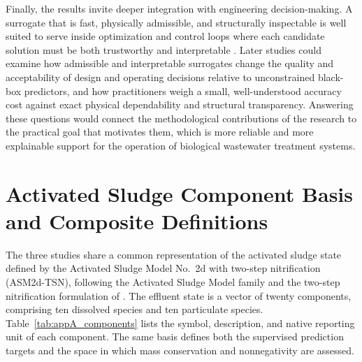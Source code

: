 \documentclass[12pt, twoside]{book}
\begin{document}
Finally, the results invite deeper integration with engineering decision-making. A surrogate that is fast,
physically admissible, and structurally inspectable is well suited to serve inside optimization and control
loops where each candidate solution must be both trustworthy and interpretable \citep{Rudin2019,Mao2024,Wang2025}.
Later studies could examine how admissible and interpretable surrogates change the quality and acceptability of
design and operating decisions relative to unconstrained black-box predictors, and how practitioners weigh a
small, well-understood accuracy cost against exact physical dependability and structural transparency. Answering
these questions would connect the methodological contributions of the research to the practical goal that
motivates them, which is more reliable and more explainable support for the operation of biological wastewater
treatment systems.



\newpage
\thispagestyle{empty}
\clearpage






\appendix

\chapter{Activated Sludge Component Basis and Composite Definitions}
\label{ch:appendix.a}

The three studies share a common representation of the activated sludge state defined by the Activated Sludge
Model No.\ 2d with two-step nitrification (ASM2d-TSN), following the Activated Sludge Model family
\citep{Henze2006} and the two-step nitrification formulation of \citet{Guerrero2011}. The effluent state is a
vector of twenty components, comprising ten dissolved species and ten particulate species.
Table~\ref{tab:appA_components} lists the symbol, description, and native reporting unit of each component. The
same basis defines both the supervised prediction targets and the space in which mass conservation and
nonnegativity are assessed.
\end{document}
